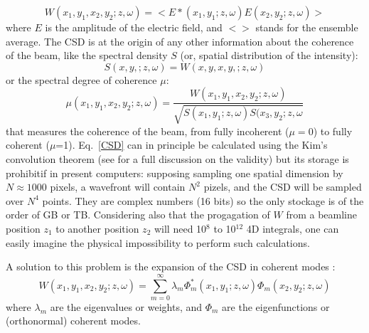 \documentclass{iucr}              %
\begin{document}
\begin{equation}\label{CSD}
W(x_1,y_1,x_2,y_2;z,\omega) = <E*(x_1,y_1; z,\omega) E(x_2,y_2;z,\omega)>
\end{equation}
where $E$ is the amplitude of the electric field, and $<>$ stands for the ensemble average. The CSD is at the origin of any other information about the coherence of the beam, like the spectral density $S$ (or, spatial distribution of the intensity): 
\begin{equation}\label{SD}
S(x,y,;z,\omega) = W(x,y,x,y,;z,\omega)
\end{equation}
or the spectral degree of coherence $\mu$:
\begin{equation}\label{SDC}
\mu(x_1,y_1,x_2,y_2;z,\omega) = \frac{W(x_1,y_1,x_2,y_2;z,\omega)}{\sqrt{ S(x_1,y_1;z,\omega) S(x_3,y_2;z,\omega}}
\end{equation}
that measures the coherence of the beam, from fully incoherent ($\mu=0$) to fully coherent ($\mu$=1). 
Eq.~\ref{CSD} can in principle be calculated using the Kim's convolution theorem \cite{kim1986} (see \cite{geloni2008} for a full discussion on the validity) but its storage is prohibitif in present computers: supposing sampling one spatial dimension by $N\approx1000$ pixels, a wavefront will contain $N^2$ pizels, and the CSD will be sampled over $N^4$ points. They are complex numbers (16 bits) so the only stockage is of the order of GB or TB. Considering also that the progagation of $W$ from a beamline position $z_1$ to another position $z_2$ will need 10$^8$ to 10$^{12}$ 4D integrals, one can easily imagine the physical impossibility to perform such calculations. 

A solution to this problem is the expansion of the CSD in coherent modes \cite{mandel_wolf}:  
\begin{equation}
 W(x_1,y_1,x_2,y_2;z,\omega) = \sum\limits_{m=0}^{\infty} \lambda_m \Phi_m^{*}(x_1,y_1;z,\omega) \Phi_m(x_2,y_2;z,\omega)
\label{decomposition}
 \end{equation}
where $\lambda_m$ are the eigenvalues or weights, and $\Phi_m$ are the eigenfunctions or (orthonormal) coherent modes. 
\end{document}
